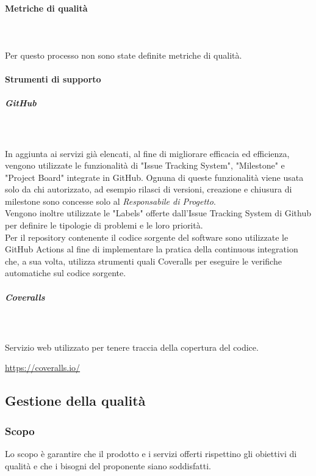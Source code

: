 \paragraph{Metriche di qualità}\mbox{} \\ \mbox{} \\
Per questo processo non sono state definite metriche di qualità.

\paragraph{Strumenti di supporto}
\subparagraph{GitHub}\mbox{} \\ \mbox{} \\
In aggiunta ai servizi già elencati, al fine di migliorare efficacia ed efficienza, vengono utilizzate le funzionalità di "Issue Tracking System", "Milestone" e "Project Board" integrate in GitHub. Ognuna di queste funzionalità viene usata solo da chi autorizzato, ad esempio rilasci di versioni, creazione e chiusura di milestone sono concesse solo al \textit{Responsabile di Progetto}.\\
Vengono inoltre utilizzate le "Labels" offerte dall’Issue Tracking System di Github per definire le tipologie di problemi e le loro priorità.\\
Per il repository contenente il codice sorgente del software sono utilizzate le GitHub Actions al fine di implementare la pratica della continuous integration che, a sua volta, utilizza strumenti quali Coveralls per eseguire le verifiche automatiche sul codice sorgente.

\subparagraph{Coveralls}\mbox{} \\ \mbox{} \\
Servizio web utilizzato per tenere traccia della copertura del codice.\\
	\centerline{\url{https://coveralls.io/}}

\subsection{Gestione della qualità}
\subsubsection{Scopo}
Lo scopo è garantire che il prodotto e i servizi offerti rispettino gli obiettivi di qualità e che i bisogni del proponente siano soddisfatti. 

